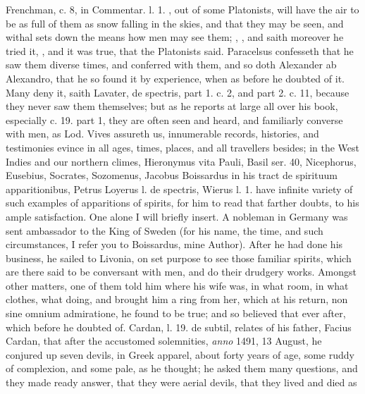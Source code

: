 {{Frenchman, c. 8, in Commentar. l. 1. , out of
some Platonists, will have the air to be as full of them as snow
falling in the skies, and that they may be seen, and withal sets down
the means how men may see them; , \etc{}, and saith
moreover he tried it, , and it was true,
that the Platonists said. Paracelsus confesseth that he saw them diverse
times, and conferred with them, and so doth Alexander ab
Alexandro, that he so found it by experience, when as before he
doubted of it. Many deny it, saith Lavater, \textlatin{de spectris}, part 1. c. 2,
and part 2. c. 11, because they never saw them themselves; but as he
reports at large all over his book, especially c. 19. part 1, they are
often seen and heard, and familiarly converse with men, as Lod. Vives
assureth us, innumerable records, histories, and testimonies evince in
all ages, times, places, and all travellers besides; in the West
Indies and our northern climes,  Hieronymus
vita Pauli, Basil ser. 40, Nicephorus, Eusebius, Socrates, Sozomenus,
Jacobus Boissardus in his tract de spirituum apparitionibus,
Petrus Loyerus l. \textlatin{de spectris}, Wierus l. 1. have infinite variety of
such examples of apparitions of spirits, for him to read that farther
doubts, to his ample satisfaction. One alone I will briefly insert. A
nobleman in Germany was sent ambassador to the King of Sweden (for his
name, the time, and such circumstances, I refer you to Boissardus, mine
Author). After he had done his business, he sailed to Livonia, on
set purpose to see those familiar spirits, which are there said to be
conversant with men, and do their drudgery works. Amongst other
matters, one of them told him where his wife was, in what room, in what
clothes, what doing, and brought him a ring from her, which at his
return, non sine omnium admiratione, he found to be true; and so
believed that ever after, which before he doubted of. Cardan, l. 19. de
subtil, relates of his father, Facius Cardan, that after the accustomed
solemnities, \emph{anno} 1491, 13 August, he conjured up seven devils, in
Greek apparel, about forty years of age, some ruddy of complexion, and
some pale, as he thought; he asked them many questions, and they made
ready answer, that they were aerial devils, that they lived and died as
}}
